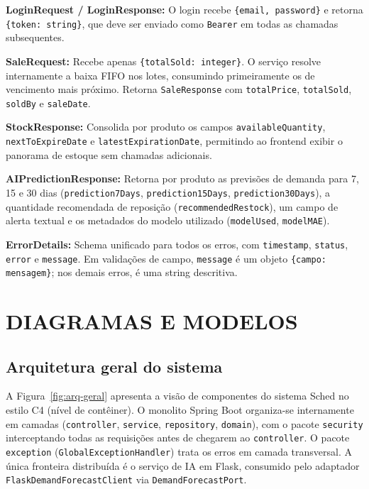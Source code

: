 \documentclass[12pt,a4paper]{article}
\begin{document}
\textbf{LoginRequest / LoginResponse:} O login recebe \texttt{\{email, password\}} e retorna \texttt{\{token: string\}}, que deve ser enviado como \texttt{Bearer} em todas as chamadas subsequentes.

\textbf{SaleRequest:} Recebe apenas \texttt{\{totalSold: integer\}}. O serviço resolve internamente a baixa FIFO nos lotes, consumindo primeiramente os de vencimento mais próximo. Retorna \texttt{SaleResponse} com \texttt{totalPrice}, \texttt{totalSold}, \texttt{soldBy} e \texttt{saleDate}.

\textbf{StockResponse:} Consolida por produto os campos \texttt{availableQuantity}, \texttt{nextToExpireDate} e \texttt{latestExpirationDate}, permitindo ao frontend exibir o panorama de estoque sem chamadas adicionais.

\textbf{AIPredictionResponse:} Retorna por produto as previsões de demanda para 7, 15 e 30 dias (\texttt{prediction7Days}, \texttt{prediction15Days}, \texttt{prediction30Days}), a quantidade recomendada de reposição (\texttt{recommendedRestock}), um campo de alerta textual e os metadados do modelo utilizado (\texttt{modelUsed}, \texttt{modelMAE}).

\textbf{ErrorDetails:} Schema unificado para todos os erros, com \texttt{timestamp}, \texttt{status}, \texttt{error} e \texttt{message}. Em validações de campo, \texttt{message} é um objeto \texttt{\{campo: mensagem\}}; nos demais erros, é uma string descritiva.

\newpage
\section{DIAGRAMAS E MODELOS}

\subsection{Arquitetura geral do sistema}

A Figura~\ref{fig:arq-geral} apresenta a visão de componentes do sistema Sched no estilo C4 (nível de contêiner). O monolito Spring Boot organiza-se internamente em camadas (\texttt{controller}, \texttt{service}, \texttt{repository}, \texttt{domain}), com o pacote \texttt{security} interceptando todas as requisições antes de chegarem ao \texttt{controller}. O pacote \texttt{exception} (\texttt{GlobalExceptionHandler}) trata os erros em camada transversal. A única fronteira distribuída é o serviço de IA em Flask, consumido pelo adaptador \texttt{FlaskDemandForecastClient} via \texttt{DemandForecastPort}.
\end{document}
